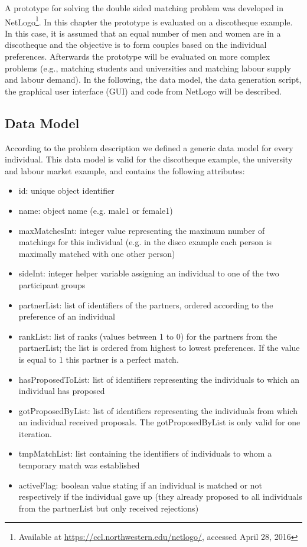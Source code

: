 \label{prototype}
A prototype for solving the double sided matching problem was developed in NetLogo\footnote{Available at \url{https://ccl.northwestern.edu/netlogo/}, accessed April 28, 2016}.
In this chapter the prototype is evaluated on a discotheque example. 
In this case, it is assumed that an equal number of men and women are in a discotheque and the objective is to form couples based on the individual preferences.
Afterwards the prototype will be evaluated on more complex problems (e.g., matching students and universities and matching labour supply and labour demand).
In the following, the data model, the data generation script, the graphical user interface (GUI) and code from NetLogo will be described.

\subsection{Data Model}
According to the problem description we defined a generic data model for every individual.
This data model is valid for the discotheque example, the university and labour market example, and contains the following attributes:
\begin{itemize}
	\item id: unique object identifier
	\item name: object name (e.g. male1 or female1)
	\item maxMatchesInt: integer value representing the maximum number of matchings for this individual (e.g. in the disco example each person is maximally matched with one other person)
	\item sideInt: integer helper variable assigning an individual to one of the two participant groups
	\item partnerList: list of identifiers of the partners, ordered according to the preference of an individual
	\item rankList: list of ranks (values between 1 to 0) for the partners from the partnerList; the list is ordered from highest to lowest preferences.
	If the value is equal to 1 this partner is a perfect match.
	\item hasProposedToList: list of identifiers representing the individuals to which an individual has proposed
	\item gotProposedByList: list of identifiers representing the individuals from which an individual received proposals.
	The gotProposedByList is only valid for one iteration.
	\item tmpMatchList: list containing the identifiers of individuals to whom a temporary match was established
	\item activeFlag: boolean value stating if an individual is matched or not respectively if the individual gave up (they already proposed to all individuals from the partnerList but only received rejections)
\end{itemize}

